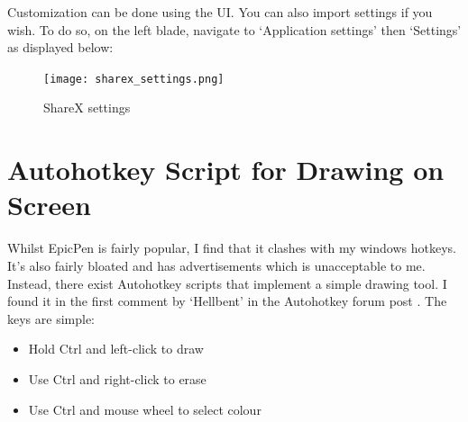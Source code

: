 Customization can be done using the UI. You can also import settings if you
wish. To do so, on the left blade, navigate to `Application settings' then
`Settings' as displayed below:
\begin{figure}[H]
    \centering
    \texttt{[image: sharex\_settings.png]}
    \caption{ShareX settings}
    \label{FigShareXSetting}
\end{figure}

\section{Autohotkey Script for Drawing on Screen}
Whilst EpicPen is fairly popular, I find that it clashes with my windows
hotkeys. It's also fairly bloated and has advertisements which is unacceptable
to me. Instead, there exist Autohotkey scripts that implement a simple drawing
tool. I found it in the first comment by `Hellbent' in the Autohotkey forum post
\cite{hellbent2019draw}. The keys are simple:
\begin{itemize}
    \item Hold Ctrl and left-click to draw
    \item Use Ctrl and right-click to erase
    \item Use Ctrl and mouse wheel to select colour
\end{itemize}
